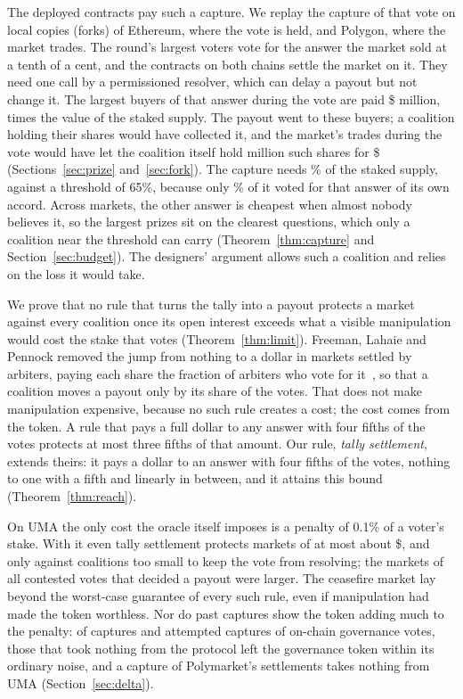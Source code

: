 \documentclass[conference,compsoc]{IEEEtran}
\makeatletter
\renewcommand\paragraph{\@startsection{paragraph}{4}{2\parindent}{0ex plus 0.1ex minus 0.1ex}{0ex}{\normalfont\normalsize\itshape}}
\makeatother
\begin{document}
The deployed contracts pay such a capture. We replay the capture of that vote on local copies (forks) of Ethereum, where the vote is held, and Polygon, where the market trades. The round's \cfCoalitionK{} largest voters vote for the answer the market sold at a tenth of a cent, and the contracts on both chains settle the market on it. They need one call by a permissioned resolver, which can delay a payout but not change it. The \forkCfHolders{} largest buyers of that answer during the vote are paid \$\forkCfPaidM{} million, \forkCfOverStake{} times the value of the staked supply. The payout went to these buyers; a coalition holding their shares would have collected it, and the market's trades during the vote would have let the coalition itself hold \cfNoTotalM{} million such shares for \$\cfCostTotal{} (Sections~\ref{sec:prize} and~\ref{sec:fork}). The capture needs \cfNeedPct\% of the staked supply, against a threshold of 65\%, because only \cfHNoPct\% of it voted for that answer of its own accord. Across markets, the other answer is cheapest when almost nobody believes it, so the largest prizes sit on the clearest questions, which only a coalition near the threshold can carry (Theorem~\ref{thm:capture} and Section~\ref{sec:budget}). The designers' argument allows such a coalition and relies on the loss it would take.

\paragraph{The limit}
We prove that no rule that turns the tally into a payout protects a market against every coalition once its open interest exceeds what a visible manipulation would cost the stake that votes (Theorem~\ref{thm:limit}). Freeman, Lahaie and Pennock removed the jump from nothing to a dollar in markets settled by arbiters, paying each share the fraction of arbiters who vote for it~\cite{freeman2017}, so that a coalition moves a payout only by its share of the votes. That does not make manipulation expensive, because no such rule creates a cost; the cost comes from the token. A rule that pays a full dollar to any answer with four fifths of the votes protects at most three fifths of that amount. Our rule, \emph{tally settlement}, extends theirs: it pays a dollar to an answer with four fifths of the votes, nothing to one with a fifth and linearly in between, and it attains this bound (Theorem~\ref{thm:reach}).

On UMA the only cost the oracle itself imposes is a penalty of 0.1\% of a voter's stake. With it even tally settlement protects markets of at most about \$\penaltyCapUsd{}, and only against coalitions too small to keep the vote from resolving; the markets of all \rampMarkets{} contested votes that decided a payout were larger. The ceasefire market lay beyond the worst-case guarantee of every such rule, even if manipulation had made the token worthless. Nor do past captures show the token adding much to the penalty: of \deltaEvents{} captures and attempted captures of on-chain governance votes, those that took nothing from the protocol left the governance token within its ordinary noise, and a capture of Polymarket's settlements takes nothing from UMA (Section~\ref{sec:delta}).
\end{document}
